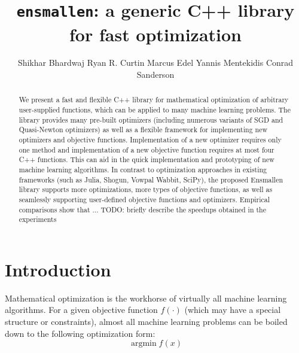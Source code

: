 \documentclass{article}
\begin{document}
\title{\texttt{ensmallen}: a generic C++ library for fast optimization}

\author{Shikhar Bhardwaj \And Ryan R. Curtin \And Marcus Edel \And Yannis
Mentekidis \And Conrad Sanderson}

\maketitle

\begin{abstract}


We present a fast and flexible C++ library for mathematical optimization of 
arbitrary user-supplied functions,
which can be applied to many machine learning problems.
The library provides many pre-built optimizers
(including numerous variants of SGD and Quasi-Newton optimizers)
as well as a flexible framework for implementing new optimizers and objective functions.
Implementation of a new optimizer requires only one method
and implementation of a new objective function requires at most four C++ functions. 
This can aid in the  quick implementation and prototyping of new machine learning algorithms.
In contrast to optimization approaches in existing frameworks
(such as Julia, Shogun, Vowpal Wabbit, SciPy),
the proposed Ensmallen library supports more optimizations,
more types of objective functions,
as well as seamlessly supporting user-defined objective functions and optimizers.
Empirical comparisons show that ...
TODO: briefly describe the speedups obtained in the experiments


\end{abstract}

\section{Introduction}

Mathematical optimization is the workhorse of virtually all machine learning
algorithms.  For a given objective function $f(\cdot)$
(which may have a special structure or constraints),
almost all machine learning problems can be boiled down
to the following optimization form:
%
\begin{equation}
\operatorname{argmin} f(x)
\end{equation}
\end{document}
